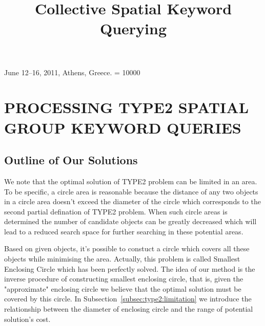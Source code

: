 \documentclass{sig-alternate}
\begin{document}
 {June 12--16, 2011, Athens, Greece.}
\widowpenalty = 10000
%

\title{Collective Spatial Keyword Querying}
%
%



\maketitle


\section{PROCESSING TYPE2 SPATIAL GROUP KEYWORD QUERIES} \label{sec:type2}
\subsection{Outline of Our Solutions}\label{subsec:type2:outline}
We note that the optimal solution of \textsf{TYPE2} problem can be limited
in an area. To be specific, a circle area is reasonable because the distance
of any two objects in a circle area doesn't exceed the diameter of the circle
which corresponds to the second partial defination of \textsf{TYPE2} problem. 
When such circle areas is determined the number of candidate objects can be greatly decreased
which will lead to a reduced search space for further searching in these potential areas.
%

Based on given objects, it's possible to constuct a circle which covers all these
objects while minimising the area. Actually, this problem is called \textsf{Smallest Enclosing Circle}
which has been perfectly solved.
The idea of our method is the inverse procedure of constructing smallest enclosing circle,
that is, given the "approximate" enclosing circle we believe that the optimal
solution must be covered by this circle.
In Subsection~\ref{subsec:type2:limitation} we introduce the relationship
between the diameter of enclosing circle and the range of potential solution's cost.
%
\end{document}
